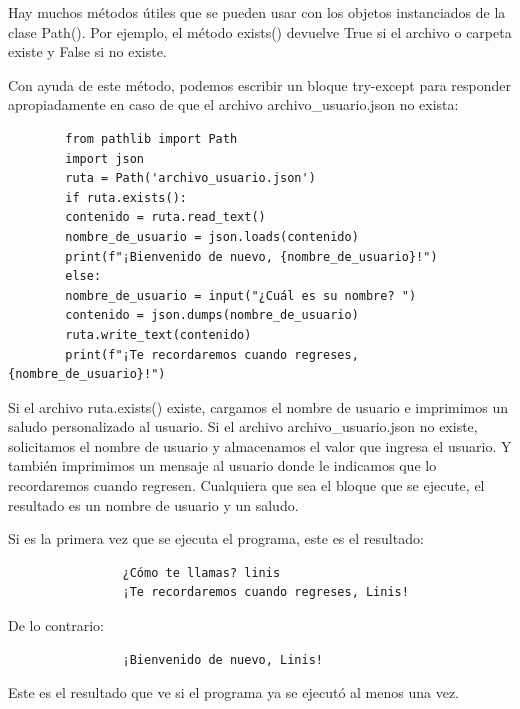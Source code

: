 {	Hay muchos métodos útiles que se  pueden usar con los objetos instanciados de la clase {\ttfamily Path()}.  
	Por ejemplo, el método {\ttfamily exists()} devuelve {\ttfamily True} si el archivo o carpeta existe y {\ttfamily False} si no existe. 
	
	Con ayuda de este método, podemos  escribir un bloque {\ttfamily try-except} para responder apropiadamente en caso de que el archivo  {\ttfamily archivo\_usuario.json} no exista: 
	
	\hspace{-2.6cm}{\ttfamily \scriptsize json\_}
	
	\vspace{-0.25cm}
	\hspace{-2.6cm}{\ttfamily \scriptsize recuerda.py}\vspace{-0.86cm}
	\begin{lstlisting}
		from pathlib import Path
		import json
		ruta = Path('archivo_usuario.json')
		if ruta.exists():
		contenido = ruta.read_text()
		nombre_de_usuario = json.loads(contenido)
		print(f"¡Bienvenido de nuevo, {nombre_de_usuario}!")
		else:
		nombre_de_usuario = input("¿Cuál es su nombre? ")
		contenido = json.dumps(nombre_de_usuario) 
		ruta.write_text(contenido)
		print(f"¡Te recordaremos cuando regreses, {nombre_de_usuario}!")
	\end{lstlisting}
	
	
	Si el archivo  {\ttfamily ruta.exists()}  existe, cargamos el nombre de usuario e imprimimos un saludo personalizado
	al usuario. Si el archivo {\ttfamily archivo\_usuario.json} no existe, solicitamos el nombre de usuario y almacenamos el valor que ingresa el usuario.  Y también imprimimos un mensaje al usuario donde le indicamos que lo recordaremos cuando regresen. Cualquiera que sea el bloque que se ejecute, el resultado es un nombre de usuario y un saludo. 
	
	Si es la primera vez que se ejecuta el programa, este es el resultado:
	
	{\ttfamily\scriptsize\scriptsize 
		\hspace{-0.65cm} \vspace{-0.3cm}	
		{\color{blue} 	
			\begin{verbatim}
				¿Cómo te llamas? linis
				¡Te recordaremos cuando regreses, Linis!	
			\end{verbatim}
	}} \noindent De lo contrario:
	
	{\ttfamily\scriptsize\scriptsize 
		\hspace{-0.65cm} \vspace{-0.3cm}	
		{\color{blue} 	
			\begin{verbatim}
				¡Bienvenido de nuevo, Linis!
			\end{verbatim}
	}}
	\noindent Este es el resultado que ve si el programa ya se ejecutó al menos una vez. \\
	
}
